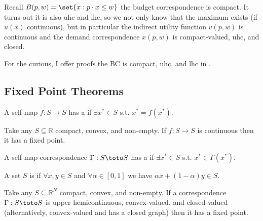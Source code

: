 \documentclass{article}
\begin{document}
Recall $B(p, w) = \set{x: p \cdot x \le w}$ the budget correspondence is compact. It turns out it is also uhc and lhc, so we not only know that the maximum exists (if $u(x)$ continuous), but in particular the indirect utility function $v(p, w)$ is continuous and the demand correspondence $x(p, w)$ is compact-valued, uhc, and closed.

\begin{remark}
  For the curious, I offer proofs the BC is compact, uhc, and lhc in .
\end{remark}

\subsection{Fixed Point Theorems}
\label{sub:fixed_point_theorems}

\begin{definition}
  A self-map $f: S \to S$ has a  if $\exists x^* \in S$ s.t.  $x^* = f(x^*)$.
\end{definition}

\begin{theorem}
  Take any $S \subseteq \mathbb{R}$ compact, convex, and non-empty. If $f: S \to S$ is continuous then it has a fixed point.
\end{theorem}

\begin{definition}
  A self-map correspondence $\Gamma: S \toto S$ has a  if $\exists x^* \in S$ s.t.  $x^* \in \Gamma(x^*)$.
\end{definition}

\begin{definition}
  A set $S$ is  if $\forall x, y \in S$ and $\forall \alpha \in [0, 1]$ we have $\alpha x + (1 - \alpha) y \in S$.
\end{definition}

\begin{theorem}
  Take any $S \subseteq \mathbb{R}^N$ compact, convex, and non-empty. If a correspondence $\Gamma: S \toto S$ is upper hemicontinuous, convex-valued, and closed-valued (alternatively, convex-valued and has a closed graph) then it has a fixed point.
\end{theorem}
\end{document}
